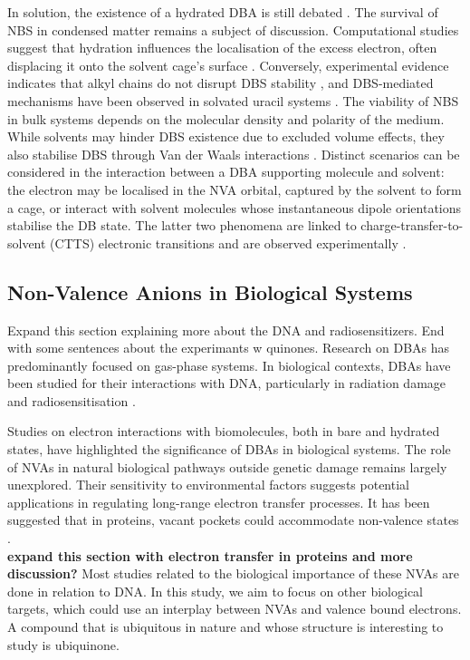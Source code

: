 In solution, the existence of a hydrated DBA is still debated \cite{anusiewicz2020fate,castellani2019stability}. The survival of NBS in condensed matter remains a subject of discussion. Computational studies suggest that hydration influences the localisation of the excess electron, often displacing it onto the solvent cage's surface \cite{anusiewicz2020fate}. Conversely, experimental evidence indicates that alkyl chains do not disrupt DBS stability \cite{castellani2019stability}, and DBS-mediated mechanisms have been observed in solvated uracil systems \cite{narayanan2024electron}. The viability of NBS in bulk systems depends on the molecular density and polarity of the medium. While solvents may hinder DBS existence due to excluded volume effects, they also stabilise DBS through Van der Waals interactions \cite{bradforth2002excited,chen2000precursors}. Distinct scenarios can be considered in the interaction between a DBA supporting molecule and solvent: the electron may be localised in the NVA orbital, captured by the solvent to form a cage, or interact with solvent molecules whose instantaneous dipole orientations stabilise the DB state. The latter two phenomena are linked to charge-transfer-to-solvent (CTTS) electronic transitions and are observed experimentally \cite{simons2023molecular,bradforth2002excited,chen2000precursors}.

\subsection{Non-Valence Anions in Biological Systems}
Expand this section explaining more about the DNA and radiosensitizers. End with some sentences about the experimants w quinones.
Research on DBAs has predominantly focused on gas-phase systems. In biological contexts, DBAs have been studied for their interactions with DNA, particularly in radiation damage and radiosensitisation \cite{gu2012interactions,narayanan2023secondary,sedmidubska2024interaction}.

Studies on electron interactions with biomolecules, both in bare and hydrated states, have highlighted the significance of DBAs in biological systems. The role of NVAs in natural biological pathways outside genetic damage remains largely unexplored. Their sensitivity to environmental factors suggests potential applications in regulating long-range electron transfer processes. It has been suggested that in proteins, vacant pockets could accommodate non-valence states \cite{castellani2019stability}.\\
\textbf{expand this section with electron transfer in proteins and more discussion?}
Most studies related to the biological importance of these NVAs are done in relation to DNA. In this study, we aim to focus on other biological targets, which could use an interplay between NVAs and valence bound electrons. A compound that is ubiquitous in nature and whose structure is interesting to study is ubiquinone.

